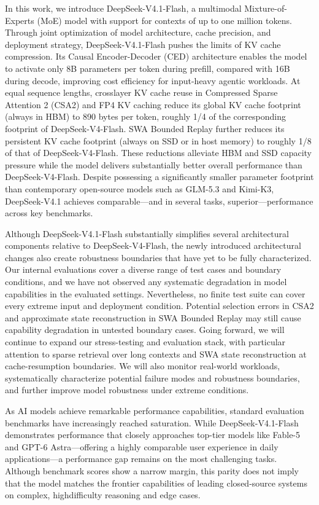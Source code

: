 \documentclass[
  10
]{article}
\begin{document}
In this work, we introduce DeepSeek-V4.1-Flash, a multimodal
Mixture-of-Experts (MoE) model with support for contexts of up to one
million tokens. Through joint optimization of model architecture, cache
precision, and deployment strategy, DeepSeek-V4.1-Flash pushes the
limits of KV cache compression. Its Causal Encoder-Decoder (CED)
architecture enables the model to activate only 8B parameters per token
during prefill, compared with 16B during decode, improving cost
efficiency for input-heavy agentic workloads. At equal sequence lengths,
crosslayer KV cache reuse in Compressed Sparse Attention 2 (CSA2) and
FP4 KV caching reduce its global KV cache footprint (always in HBM) to
890 bytes per token, roughly 1/4 of the corresponding footprint of
DeepSeek-V4-Flash. SWA Bounded Replay further reduces its persistent KV
cache footprint (always on SSD or in host memory) to roughly 1/8 of that
of DeepSeek-V4-Flash. These reductions alleviate HBM and SSD capacity
pressure while the model delivers substantially better overall
performance than DeepSeek-V4-Flash. Despite possessing a significantly
smaller parameter footprint than contemporary open-source models such as
GLM-5.3 and Kimi-K3, DeepSeek-V4.1 achieves comparable---and in several
tasks, superior---performance across key benchmarks.

Although DeepSeek-V4.1-Flash substantially simplifies several
architectural components relative to DeepSeek-V4-Flash, the newly
introduced architectural changes also create robustness boundaries that
have yet to be fully characterized. Our internal evaluations cover a
diverse range of test cases and boundary conditions, and we have not
observed any systematic degradation in model capabilities in the
evaluated settings. Nevertheless, no finite test suite can cover every
extreme input and deployment condition. Potential selection errors in
CSA2 and approximate state reconstruction in SWA Bounded Replay may
still cause capability degradation in untested boundary cases. Going
forward, we will continue to expand our stress-testing and evaluation
stack, with particular attention to sparse retrieval over long contexts
and SWA state reconstruction at cache-resumption boundaries. We will
also monitor real-world workloads, systematically characterize potential
failure modes and robustness boundaries, and further improve model
robustness under extreme conditions.

As AI models achieve remarkable performance capabilities, standard
evaluation benchmarks have increasingly reached saturation. While
DeepSeek-V4.1-Flash demonstrates performance that closely approaches
top-tier models like Fable-5 and GPT-6 Astra---offering a highly
comparable user experience in daily applications---a performance gap
remains on the most challenging tasks. Although benchmark scores show a
narrow margin, this parity does not imply that the model matches the
frontier capabilities of leading closed-source systems on complex,
highdifficulty reasoning and edge cases.
\end{document}

